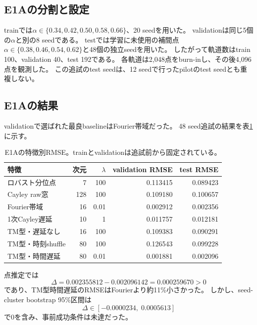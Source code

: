 \documentclass[a4paper,11pt]{jlreq}
\begin{document}
\subsection{E1Aの分割と設定}

trainでは$\alpha\in\{0.34,0.42,0.50,0.58,0.66\}$、20 seedを用いた。
validationは同じ5個の$\alpha$と別の8 seedである。
testでは学習に未使用の補間点
$\alpha\in\{0.38,0.46,0.54,0.62\}$と48個の独立seedを用いた。
したがって軌道数はtrain 100、validation 40、test 192である。
各軌道は2,048点をburn-inし、その後4,096点を観測した。
この追試のtest seedは、12 seedで行ったpilotのtest seedとも重複しない。

\subsection{E1Aの結果}

validationで選ばれた最良baselineはFourier帯域だった。
48 seed追試の結果を表\ref{tab:e1-feature-results}に示す。

\begin{table}[htbp]
\centering
\small
\caption{E1Aの特徴別RMSE。trainとvalidationは追試前から固定されている。}
\label{tab:e1-feature-results}
\begin{tabular}{lrrrr}
\toprule
特徴 & 次元 & $\lambda$ & validation RMSE & test RMSE \\
\midrule
ロバスト分位点 & 7 & 100 & 0.113415 & 0.089423 \\
Cayley raw窓 & 128 & 100 & 0.109180 & 0.100657 \\
Fourier帯域 & 16 & 0.01 & 0.002912 & 0.002356 \\
1次Cayley遅延 & 10 & 1 & 0.011757 & 0.012181 \\
TM型・遅延なし & 16 & 100 & 0.109383 & 0.090291 \\
TM型・時刻shuffle & 80 & 100 & 0.126543 & 0.099228 \\
TM型・時間遅延 & 80 & 0.01 & 0.001881 & 0.002096 \\
\bottomrule
\end{tabular}
\end{table}

点推定では
\begin{equation}
    \Delta
    =0.002355812-0.002096142
    =0.000259670>0
\end{equation}
であり、TM型時間遅延のRMSEはFourierより約11\%小さかった。
しかし、seed-cluster bootstrap 95\%区間は
\begin{equation}
    \Delta\in[-0.0000234,\;0.0005613]
    \label{eq:e1-bootstrap-result}
\end{equation}
で0を含み、事前成功条件は未達だった。
\end{document}
